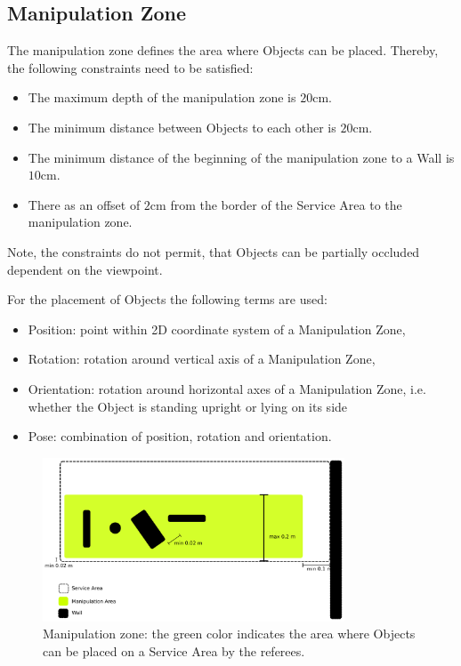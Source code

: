 \subsection{Manipulation Zone} \label{ssec:ManipulationZone}
The manipulation zone defines the area where Objects can be placed. Thereby, the following constraints need to be satisfied:
\begin{itemize}
	\item The maximum depth of the manipulation zone is $20\si{\centi\meter}$.
	\item The minimum distance between Objects to each other is $20\si{\centi\meter}$.
	\item The minimum distance of the beginning of the manipulation zone to a Wall is $10\si{\centi\meter}$.
	\item There as an offset of $2\si{\centi\meter}$ from the border of the Service Area to the manipulation zone.
\end{itemize}
Note, the constraints do not permit, that Objects can be partially occluded dependent on the viewpoint.

For the placement of Objects the following terms are used:

\begin{itemize}
	\item Position: point within 2D coordinate system of a Manipulation Zone,
	\item Rotation: rotation around vertical axis of a Manipulation Zone,
	\item Orientation: rotation around horizontal axes of a Manipulation Zone, i.e. whether the Object is standing upright or lying on its side
	\item Pose: combination of position, rotation and orientation.
\end{itemize}
\begin{figure} [h!]
\centering
\includegraphics[width=0.8\textwidth ]{./images/manipulation_zone.pdf}
\caption{Manipulation zone: the green color indicates the area where Objects can be placed on a Service Area by the referees.}
\label{fig:manipulation_zone}
\end{figure}

